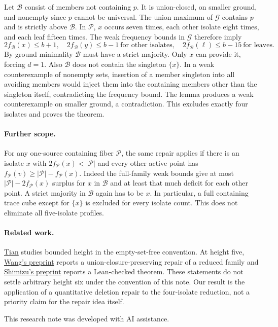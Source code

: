 \documentclass[11pt,letterpaper]{article}
\begin{document}
Let \(\mathcal B\) consist of members not containing \(p\).
It is union-closed, on smaller ground, and nonempty since
\(p\) cannot be universal. The union maximum of \(\mathcal G\)
contains \(p\) and is strictly above \(\mathcal B\).
In \(\mathcal P\), \(x\) occurs seven times, each other isolate
eight times, and each leaf fifteen times. The weak frequency bounds
in \(\mathcal G\) therefore imply
\[
 2f_{\mathcal B}(x)\le b+1,\quad
 2f_{\mathcal B}(y)\le b-1\ \text{for other isolates},\quad
 2f_{\mathcal B}(\ell)\le b-15\ \text{for leaves}.
\]
By ground minimality \(\mathcal B\) must have a strict majority.
Only \(x\) can provide it, forcing \(d=1\). Also \(\mathcal B\)
does not contain the singleton \(\{x\}\). In a weak counterexample
of nonempty sets, insertion of a member singleton into all
avoiding members would inject them into the containing members
other than the singleton itself, contradicting the frequency bound.
The lemma produces a weak counterexample on smaller ground, a
contradiction. This excludes exactly four isolates and proves
the theorem.

\paragraph{Further scope.}
For any one-source containing fiber \(\mathcal P\), the same repair
applies if there is an isolate \(x\) with
\(2f_{\mathcal P}(x)<|\mathcal P|\) and every other active point
has \(f_{\mathcal P}(v)\ge |\mathcal P|-f_{\mathcal P}(x)\).
Indeed the full-family weak bounds give at most
\(|\mathcal P|-2f_{\mathcal P}(x)\) surplus for \(x\) in
\(\mathcal B\) and at least that much deficit for each other
point. A strict majority in \(\mathcal B\) again has to be \(x\).
In particular, a full containing trace cube except for \(\{x\}\)
is excluded for every isolate count. This does not eliminate
all five-isolate profiles.

\paragraph{Related work.}
\href{https://arxiv.org/abs/2608.25147}{Tian} studies bounded height in
the empty-set-free convention. At height five,
\href{https://zenodo.org/records/23252932}{Wang's preprint} reports a
union-closure-preserving repair of a reduced family and
\href{https://zenodo.org/records/23244603}{Shimizu's preprint} reports a
Lean-checked theorem. These statements do not settle arbitrary height six
under the convention of this note. Our result is the application of a
quantitative deletion repair to the four-isolate reduction, not a
priority claim for the repair idea itself.

\medskip\noindent
This research note was developed with AI assistance.
\end{document}
